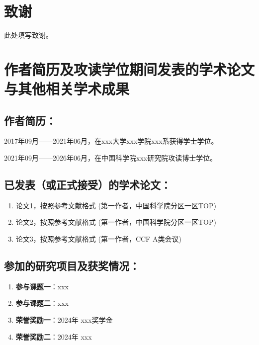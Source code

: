\chapter[致谢]{致\quad 谢}%

此处填写致谢。


\chapter{作者简历及攻读学位期间发表的学术论文与其他相关学术成果}

\section*{作者简历：}
2017年09月——2021年06月，在xxx大学xxx学院xxx系获得学士学位。

2021年09月——2026年06月，在中国科学院xxx研究院攻读博士学位。


\section*{已发表（或正式接受）的学术论文：}

{
\setlist[enumerate]{}%
\begin{enumerate}[nosep]
    \item 论文1，按照参考文献格式 (第一作者，中国科学院分区一区TOP)
    \item 论文2，按照参考文献格式 (第一作者，中国科学院分区一区TOP)
    \item 论文3，按照参考文献格式 (第一作者，CCF A类会议)
\end{enumerate}
}



\section*{参加的研究项目及获奖情况：}
{
\setlist[enumerate]{}%
\begin{enumerate}[nosep]
    \item \textbf{参与课题一}：xxx
    \item \textbf{参与课题二}：xxx
    \item \textbf{荣誉奖励一}：2024年 xxx奖学金 
    \item \textbf{荣誉奖励二}：2024年 xxx
\end{enumerate}
}


\cleardoublepage[plain]%
